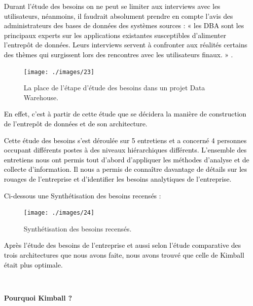 \documentclass[a4paper,12pt]{report}
\begin{document}
\textcolor{black}{Durant l’étude des besoins on ne peut se limiter aux interviews avec les utilisateurs, néanmoins, il faudrait absolument prendre en compte l’avis des administrateurs des bases de données des systèmes sources : « les DBA sont les principaux experts sur les applications existantes susceptibles d'alimenter l'entrepôt de données. Leurs interviews servent à confronter aux réalités certains des thèmes qui surgissent lors des rencontres avec les utilisateurs finaux. » \citep{kimball1996data}.}

\begin{figure}[H]

\begin{center}
\texttt{[image: ./images/23]}
\end{center}

\caption{La place de l’étape d’étude des besoins dans un projet Data Warehouse.}
\label{fig:1}

\end{figure}

\textcolor{black}{En effet, c'est à partir de cette étude que se décidera la manière de construction de l’entrepôt de données et de son architecture. }

\textcolor{black}{Cette étude des besoins s’est déroulée sur 5 entretiens et a concerné 4 personnes occupant différents postes à des niveaux hiérarchiques différents. L’ensemble des entretiens nous ont permis tout d’abord d’appliquer les méthodes d’analyse et de collecte d’information. Il nous a permis de connaître davantage de détails sur les rouages de l’entreprise et d’identifier les besoins analytiques de l’entreprise.}

\textcolor{black}{Ci-dessous une Synthétisation des besoins recensés : }


\begin{figure}[H]

\begin{center}
\texttt{[image: ./images/24]}
\end{center}

\caption{Synthétisation des besoins recensés.}
\label{fig:1}

\end{figure}

\textcolor{black}{Après l’étude des besoins de l’entreprise et aussi selon l’étude comparative des trois architectures que nous avons faite, nous avons trouvé que celle de Kimball était plus optimale.}

~\

\textbf{Pourquoi Kimball ?}
\end{document}
